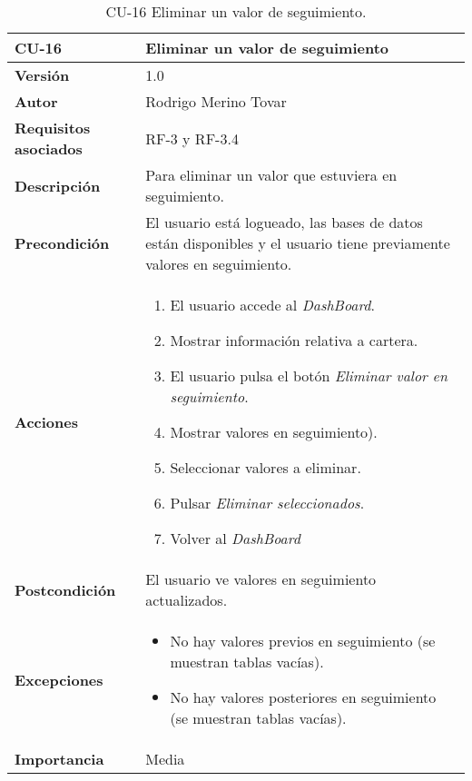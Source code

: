 \begin{table}[p]
	\centering
	\begin{tabularx}{\linewidth}{ p{} p{} }
		\toprule
		\textbf{CU-16}    & \textbf{Eliminar un valor de seguimiento}\\
		\toprule
		\textbf{Versión}              & 1.0    \\
		\textbf{Autor}                & Rodrigo Merino Tovar \\
		\textbf{Requisitos asociados} & RF-3 y RF-3.4 \\
		\textbf{Descripción}          & Para eliminar un valor que estuviera en seguimiento.\\
		\textbf{Precondición}         & El usuario está logueado, las bases de datos están disponibles y el usuario tiene previamente valores en seguimiento.  \\
		\textbf{Acciones}             &
		\begin{enumerate}
			\def\labelenumi{\arabic{enumi}.}
			\tightlist
			\item El usuario accede al \emph{DashBoard}. 
			\item Mostrar información relativa a cartera.
			\item El usuario pulsa el botón \emph{Eliminar valor en seguimiento}.  
			\item Mostrar valores en seguimiento).
			\item Seleccionar valores a eliminar.
			\item Pulsar \emph{Eliminar seleccionados}.
			\item Volver al \emph{DashBoard}
		\end{enumerate}\\
		\textbf{Postcondición}        & El usuario ve valores en seguimiento actualizados. \\
		\textbf{Excepciones}          & 
		\begin{itemize}
			\tightlist
			\item No hay valores previos en seguimiento (se muestran tablas vacías).
			\item No hay valores posteriores en seguimiento (se muestran tablas vacías).
		\end{itemize} \\
		\textbf{Importancia}          & Media \\
		\bottomrule
	\end{tabularx}
	\caption{CU-16 Eliminar un valor de seguimiento.}
\end{table}


